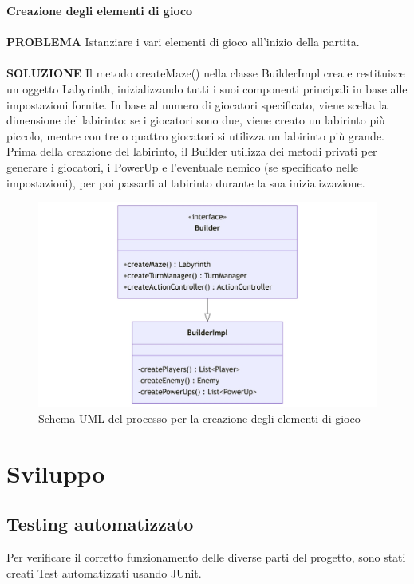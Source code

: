 \documentclass[a4paper,12pt]{report}
\begin{document}
\textbf{Creazione degli elementi di gioco}
\\
\\
\textbf{PROBLEMA}
Istanziare i vari elementi di gioco all’inizio della partita.
\\
\\
\textbf{SOLUZIONE}
Il metodo createMaze() nella classe BuilderImpl crea e restituisce un oggetto Labyrinth, inizializzando tutti i 
suoi componenti principali in base alle impostazioni fornite.
In base al numero di giocatori specificato, viene scelta la dimensione del labirinto: se i giocatori sono due, 
viene creato un labirinto più piccolo, mentre con tre o quattro giocatori si utilizza un labirinto più grande.
Prima della creazione del labirinto, il Builder utilizza dei metodi privati per generare i giocatori, i PowerUp 
e l’eventuale nemico (se specificato nelle impostazioni), per poi passarli al labirinto durante la sua inizializzazione.
\begin{figure}[H]
	\centering{}
	\includegraphics[width=14cm]{img/CreazioneElementi.png}
	\caption{Schema UML del processo per la creazione degli elementi di gioco}
	\label{img:Traduzione Informazioni}
\end{figure}

\chapter{Sviluppo}
\section{Testing automatizzato}

Per verificare il corretto funzionamento delle diverse parti del progetto, sono
 stati creati Test automatizzati usando JUnit.
\end{document}
